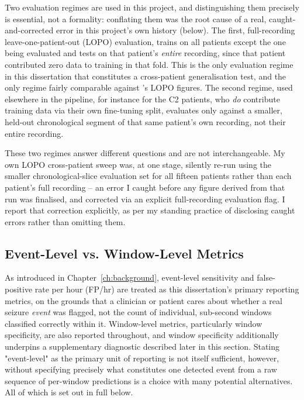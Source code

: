 Two evaluation regimes are used in this project, and distinguishing them precisely is essential, not a formality: conflating them was the root cause of a real, 
caught-and-corrected error in this project's own history (below). The first, full-recording leave-one-patient-out (LOPO) evaluation, trains on all patients except the one being 
evaluated and tests on that patient's \emph{entire} recording, since that patient contributed zero data to training in that fold. This is the only evaluation regime in this 
dissertation that constitutes a cross-patient generalisation test, and the only regime fairly comparable against \citet{ali2024}'s LOPO figures. The second regime, used 
elsewhere in the pipeline, for instance for the C2 patients, who \emph{do} contribute training data via their own fine-tuning split, evaluates only against 
a smaller, held-out chronological segment of that same patient's own recording, not their entire recording.

These two regimes answer different questions and are not interchangeable. My own LOPO cross-patient sweep was, at one stage, silently re-run using the smaller chronological-slice 
evaluation set for all fifteen patients rather than each patient's full recording -- an error I caught before any figure derived from that run was finalised, and corrected via an 
explicit full-recording evaluation flag. I report that correction explicitly, as per my standing practice of disclosing caught errors rather than omitting them.

\subsection{Event-Level vs. Window-Level Metrics}

As introduced in Chapter~\ref{ch:background}, event-level sensitivity and false-positive rate per hour (FP/hr) are treated as this dissertation's primary reporting metrics, on the 
grounds that a clinician or patient cares about whether a real seizure \emph{event} was flagged, not the count of individual, sub-second windows classified correctly within it.
Window-level metrics, particularly window specificity, are also reported throughout, and window specificity additionally underpins a supplementary diagnostic described later in this section. 
Stating "event-level" as the primary unit of reporting is not itself 
sufficient, however, without specifying precisely what constitutes one detected event from a raw sequence of per-window predictions is a choice with many potential alternatives.
All of which is set out in full below.

